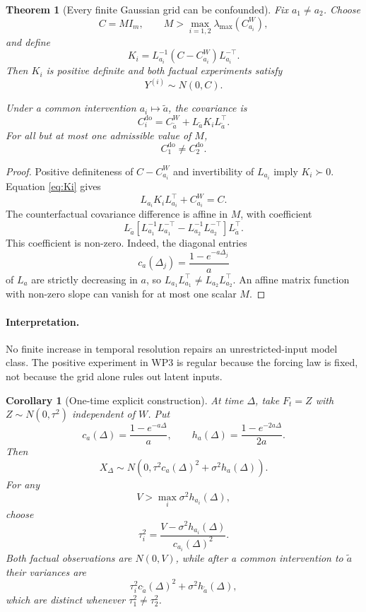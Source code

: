 \documentclass[11pt]{article}
\newtheorem{theorem}[assumption]{Theorem}
\newtheorem{corollary}[assumption]{Corollary}
\theoremstyle{remark}
\newcommand{\doop}{\operatorname{do}}
\begin{document}
\begin{theorem}[Every finite Gaussian grid can be confounded]\label{thm:grid}
Fix $a_1\neq a_2$. Choose
\[
 C=MI_m,
 \qquad
 M>\max_{i=1,2}\lambda_{\max}(C_{a_i}^W),
\]
and define
\begin{equation}\label{eq:Ki}
 K_i
 =
 L_{a_i}^{-1}(C-C_{a_i}^W)L_{a_i}^{-\top}.
\end{equation}
Then $K_i$ is positive definite and both factual experiments satisfy
\[
 Y^{(i)}\sim N(0,C).
\]

Under a common intervention $a_i\mapsto\widetilde a$, the covariance is
\[
 C_i^{\doop}
 =
 C_{\widetilde a}^W
 +
 L_{\widetilde a}K_iL_{\widetilde a}^\top.
\]
For all but at most one admissible value of $M$,
\[
 C_1^{\doop}\neq C_2^{\doop}.
\]
\end{theorem}

\begin{proof}
Positive definiteness of $C-C_{a_i}^W$ and invertibility of $L_{a_i}$ imply $K_i\succ0$. Equation \eqref{eq:Ki} gives
\[
 L_{a_i}K_iL_{a_i}^\top+C_{a_i}^W=C.
\]
The counterfactual covariance difference is affine in $M$, with coefficient
\[
 L_{\widetilde a}
 \left[
 L_{a_1}^{-1}L_{a_1}^{-\top}
 -
 L_{a_2}^{-1}L_{a_2}^{-\top}
 \right]
 L_{\widetilde a}^\top.
\]
This coefficient is non-zero. Indeed, the diagonal entries
\[
 c_a(\Delta_j)=\frac{1-e^{-a\Delta_j}}{a}
\]
of $L_a$ are strictly decreasing in $a$, so $L_{a_1}L_{a_1}^\top\neq L_{a_2}L_{a_2}^\top$. An affine matrix function with non-zero slope can vanish for at most one scalar $M$.
\end{proof}

\paragraph{Interpretation.}
No finite increase in temporal resolution repairs an unrestricted-input model class. The positive experiment in WP3 is regular because the forcing law is fixed, not because the grid alone rules out latent inputs.

\begin{corollary}[One-time explicit construction]\label{cor:one-time}
At time $\Delta$, take $F_t=Z$ with $Z\sim N(0,\tau^2)$ independent of $W$. Put
\[
 c_a(\Delta)=\frac{1-e^{-a\Delta}}{a},
 \qquad
 h_a(\Delta)=\frac{1-e^{-2a\Delta}}{2a}.
\]
Then
\[
 X_\Delta\sim
 N\left(0,\tau^2c_a(\Delta)^2+\sigma^2h_a(\Delta)\right).
\]
For any
\[
 V>\max_i\sigma^2h_{a_i}(\Delta),
\]
choose
\[
 \tau_i^2
 =
 \frac{V-\sigma^2h_{a_i}(\Delta)}
 {c_{a_i}(\Delta)^2}.
\]
Both factual observations are $N(0,V)$, while after a common intervention to $\widetilde a$ their variances are
\[
 \tau_i^2c_{\widetilde a}(\Delta)^2+\sigma^2h_{\widetilde a}(\Delta),
\]
which are distinct whenever $\tau_1^2\neq\tau_2^2$.
\end{corollary}
\end{document}
